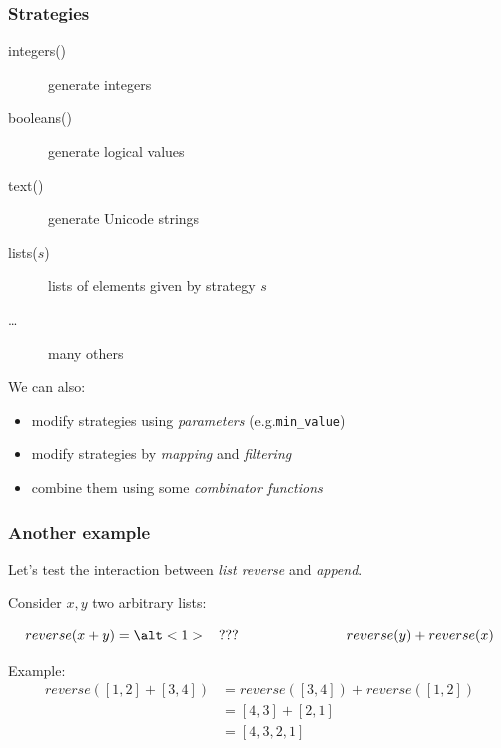 \documentclass{beamer}
\begin{document}
\begin{frame}
  \frametitle{Strategies}

  \begin{description}
  \item[integers()] generate integers
  \item[booleans()] generate logical values 
  \item[text()] generate Unicode strings
  \item[lists($s$)] lists of elements given by strategy $s$
    \item[\ldots] many others
  \end{description}
  \bigskip
  
  We can also:
  \begin{itemize}
  \item modify strategies using \emph{parameters} (e.g.\@ \texttt{min\_value})
  \item modify strategies by \emph{mapping} and \emph{filtering}
  \item combine them using some \emph{combinator functions}
  \end{itemize} 
\end{frame}


\begin{frame}
  \frametitle{Another example}

  Let's test the interaction between \emph{list reverse}
  and \emph{append}.
  
  Consider $x, y$ two arbitrary lists:

  \[  reverse(x + y) = \alt<1>{\hspace{2ex}???\hspace{18ex}}{reverse(y) + reverse(x)} \]
  \pause

  Example:
  \[\begin{array}{ll}
      reverse([1,2] + [3,4]) &= reverse([3,4]) + reverse([1,2]) \\
                             &= [4,3] + [2,1]\\
                             &= [4,3,2,1]
  \end{array}\] 
\end{frame}
\end{document}
